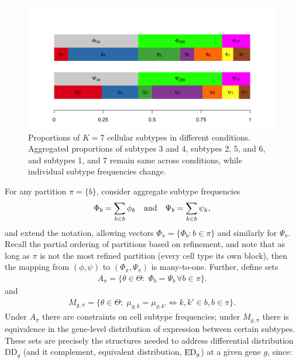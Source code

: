 \documentclass[11pt]{amsart}
\begin{document}
\begin{figure}[h!]
  \includegraphics[width=\linewidth]{Figs/schematic-1.png}
  \caption{Proportions of $K=7$ cellular subtypes in different conditions. 
 Aggregated proportions of subtypes 3 and 4, subtypes 2, 5, and 6, and subtypes 1, and 7 
 remain same across conditions, while individual subtype frequencies change.  }
  \label{fig:1}
\end{figure}



For any partition $\pi=\{b\}$, consider aggregate subtype frequencies
\begin{eqnarray*}
\Phi_b = \sum_{k\in b} \phi_k \quad {\mbox {\rm  and}} \quad 
 \Psi_b = \sum_{k\in b} \psi_k,
\end{eqnarray*}
and extend the notation, allowing vectors $\Phi_\pi = \{ \Phi_b: b \in \pi \}$ and similarly
for $\Psi_\pi$. Recall the partial ordering of partitions based on refinement, and note that
as long as $\pi$ is not the most refined partition (every cell type its own block),
then the mapping from $( \phi, \psi )$ to $( \Phi_\pi, \Psi_\pi)$ is many-to-one.
Further, define sets
\begin{eqnarray*}
A_\pi = \{ \theta\in \Theta: \; \Phi_b = \Psi_b  \, \forall b \in \pi \}.
\end{eqnarray*}
and
\begin{eqnarray*}
M_{g,\pi} = \{ \theta \in \Theta: \; \mu_{g,k} = \mu_{g,k'} \iff k,k' \in b, b \in \pi \}.
\end{eqnarray*}
Under $A_\pi$ there are constraints on cell subtype frequencies; under $M_{g,\pi}$ there is 
equivalence in the gene-level distribution of expression between certain subtypes.
These sets are precisely the
structures needed to address differential distribution DD$_g$ (and
it complement, equivalent distribution, ${\rm ED}_g$) at a given gene
$g$, since:
\end{document}
